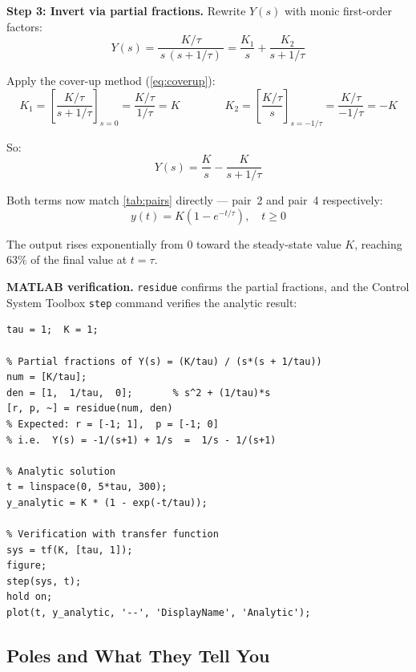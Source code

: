\documentclass[12pt]{article}
\newcommand{\figplaceholder}[2][3in]{%
  \begin{center}
  \fbox{\parbox{#1}{\centering\vspace{0.5in}\textit{[Figure: #2]}\vspace{0.5in}}}
  \end{center}
}
\begin{document}
\textbf{Step 3: Invert via partial fractions.}  Rewrite $Y(s)$ with monic
first-order factors:
\[
  Y(s) = \frac{K/\tau}{\,s\,(s + 1/\tau)\,} = \frac{K_1}{s} + \frac{K_2}{s + 1/\tau}
\]

Apply the cover-up method (\cref{eq:coverup}):
\[
  K_1 = \left[\frac{K/\tau}{s + 1/\tau}\right]_{s=0}
      = \frac{K/\tau}{1/\tau} = K
  \qquad\qquad
  K_2 = \left[\frac{K/\tau}{s}\right]_{s=-1/\tau}
      = \frac{K/\tau}{-1/\tau} = -K
\]

So:
\begin{equation}
  Y(s) = \frac{K}{s} - \frac{K}{s + 1/\tau}
  \label{eq:fo_pf}
\end{equation}

Both terms now match \cref{tab:pairs} directly --- pair~2 and pair~4
respectively:
\begin{equation}
  \boxed{y(t) = K\!\left(1 - e^{-t/\tau}\right), \quad t \geq 0}
  \label{eq:fo_response}
\end{equation}

The output rises exponentially from 0 toward the steady-state value $K$,
reaching $63\%$ of the final value at $t = \tau$.

\figplaceholder[3.5in]{First-order step response $y(t) = K(1-e^{-t/\tau})$ for
  $K=1$, $\tau = 1\,\text{s}$.  Annotate the $63\%$ point at $t = \tau$ and
  the asymptote at $y = K$.}

\textbf{MATLAB verification.}  \texttt{residue} confirms the partial fractions,
and the Control System Toolbox \texttt{step} command verifies the analytic
result:
\begin{Verbatim}[frame=single, fontsize=\small]
tau = 1;  K = 1;

% Partial fractions of Y(s) = (K/tau) / (s*(s + 1/tau))
num = [K/tau];
den = [1,  1/tau,  0];       % s^2 + (1/tau)*s
[r, p, ~] = residue(num, den)
% Expected: r = [-1; 1],  p = [-1; 0]
% i.e.  Y(s) = -1/(s+1) + 1/s  =  1/s - 1/(s+1)

% Analytic solution
t = linspace(0, 5*tau, 300);
y_analytic = K * (1 - exp(-t/tau));

% Verification with transfer function
sys = tf(K, [tau, 1]);
figure;
step(sys, t);
hold on;
plot(t, y_analytic, '--', 'DisplayName', 'Analytic');
\end{Verbatim}

\subsection{Poles and What They Tell You}
\label{sec:poles}
\end{document}
